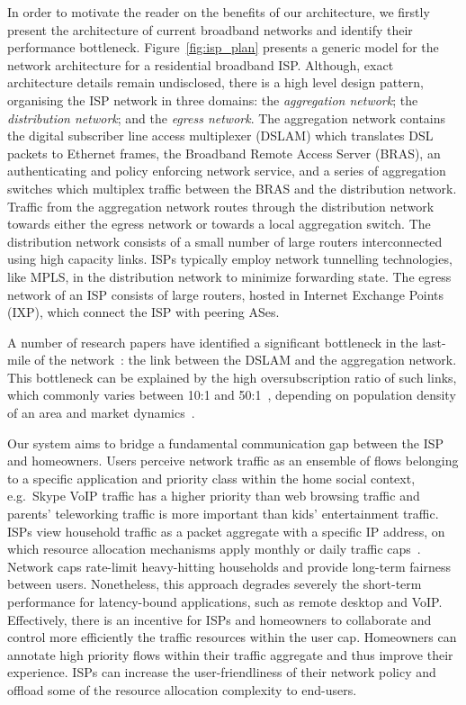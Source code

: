 In order to motivate the reader on the benefits of our architecture, we firstly
present the architecture of current broadband networks and identify their
performance bottleneck. Figure~\ref{fig:isp_plan} presents a generic model for
the network architecture for a residential broadband ISP\@. Although, exact
architecture details remain undisclosed, there is a high level design pattern,
organising the ISP network in three domains: the \textit{aggregation network};
the \textit{distribution network}; and the \textit{egress network}. The
aggregation network contains the digital subscriber line access multiplexer
(DSLAM) which translates DSL packets to Ethernet frames, the Broadband Remote
Access Server (BRAS), an authenticating and policy enforcing network service,
and a series of aggregation switches which multiplex traffic between the BRAS and
the distribution network.  Traffic from the aggregation network routes through
the distribution network towards either the egress network or towards a local
aggregation switch. The distribution network consists of a small number of
large routers interconnected using high capacity links.  ISPs typically employ
network tunnelling technologies, like MPLS, in the distribution network to
minimize forwarding state.  The egress network of an ISP consists of large
routers, hosted in Internet Exchange Points (IXP), which connect the ISP with
peering ASes.

A number of research papers have identified a significant bottleneck in the
last-mile of the network~: the link between
the DSLAM and the aggregation network. This bottleneck can be explained by the
high oversubscription ratio of such links, which commonly varies between 10:1
and 50:1~, depending on population density of an area
and market dynamics~.  

Our system aims to bridge a fundamental communication gap between the ISP and
homeowners. Users perceive network traffic as an ensemble of flows belonging to
a specific application and priority class within the home social context,
e.g.~Skype VoIP traffic has a higher priority than web browsing traffic and
parents' teleworking traffic is more important than kids' entertainment
traffic. ISPs view household traffic as a packet aggregate with a specific IP
address, on which resource allocation mechanisms apply monthly or daily traffic
caps~.  Network caps rate-limit heavy-hitting
households and provide long-term fairness between users. Nonetheless, this
approach degrades severely the short-term performance for latency-bound
applications, such as remote desktop and VoIP\@. Effectively, there is an
incentive for ISPs and homeowners to collaborate and control more efficiently
the traffic resources within the user cap.  Homeowners can annotate high
priority flows within their traffic aggregate and thus improve their
experience. ISPs can increase the user-friendliness of their network policy and
offload some of the resource allocation complexity to end-users. 

